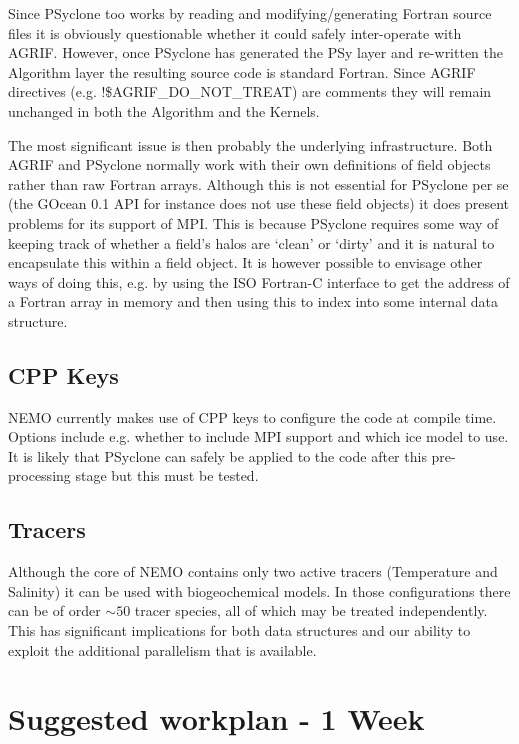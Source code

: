 \documentclass{article}
\begin{document}
Since PSyclone too works by reading and modifying/generating Fortran
source files it is obviously questionable whether it could safely
inter-operate with AGRIF. However, once PSyclone has generated the PSy
layer and re-written the Algorithm layer the resulting source code is
standard Fortran. Since AGRIF directives
(e.g. !\$AGRIF\_DO\_NOT\_TREAT) are comments they will remain unchanged
in both the Algorithm and the Kernels.

The most significant issue is then probably the underlying
infrastructure.  Both AGRIF and PSyclone normally work with their own
definitions of field objects rather than raw Fortran arrays. Although
this is not essential for PSyclone per se (the GOcean 0.1 API for
instance does not use these field objects) it does present problems
for its support of MPI. This is because PSyclone requires some way of
keeping track of whether a field's halos are `clean' or `dirty' and it
is natural to encapsulate this within a field object. It is however
possible to envisage other ways of doing this, e.g. by using the ISO
Fortran-C interface to get the address of a Fortran array in memory
and then using this to index into some internal data structure.

\subsection{CPP Keys}

NEMO currently makes use of CPP keys to configure the code at compile
time. Options include e.g. whether to include MPI support and which
ice model to use. It is likely that PSyclone can safely be applied to
the code after this pre-processing stage but this must be tested.

\subsection{Tracers}

Although the core of NEMO contains only two active tracers
(Temperature and Salinity) it can be used with biogeochemical
models. In those configurations there can be of order $\sim 50$ tracer
species, all of which may be treated independently. This has
significant implications for both data structures and our ability to
exploit the additional parallelism that is available.

\section{Suggested workplan - 1 Week}
\end{document}
